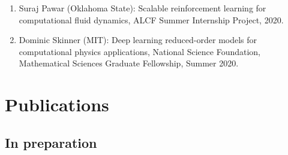 \documentclass[letterpaper]{article}
\begin{document}
\begin{enumerate}

  \item Suraj Pawar (Oklahoma State): Scalable reinforcement learning for computational fluid dynamics, ALCF Summer Internship Project, 2020.

  \item Dominic Skinner (MIT): Deep learning reduced-order models for computational physics applications, National Science Foundation, Mathematical Sciences Graduate Fellowship, Summer 2020.


\end{enumerate}

\section*{Publications}

\subsection*{In preparation}
\end{document}
